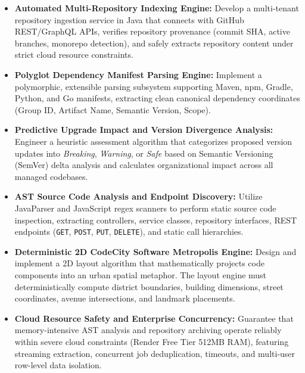 \documentclass[11pt,a4paper,openany]{report}
\begin{document}
\begin{itemize}[leftmargin=1.5cm]
    \item[\textbf{OBJ-1:}] \textbf{Automated Multi-Repository Indexing Engine:} Develop a multi-tenant repository ingestion service in Java that connects with GitHub REST/GraphQL APIs, verifies repository provenance (commit SHA, active branches, monorepo detection), and safely extracts repository content under strict cloud resource constraints.
    
    \item[\textbf{OBJ-2:}] \textbf{Polyglot Dependency Manifest Parsing Engine:} Implement a polymorphic, extensible parsing subsystem supporting Maven, npm, Gradle, Python, and Go manifests, extracting clean canonical dependency coordinates (Group ID, Artifact Name, Semantic Version, Scope).
    
    \item[\textbf{OBJ-3:}] \textbf{Predictive Upgrade Impact and Version Divergence Analysis:} Engineer a heuristic assessment algorithm that categorizes proposed version updates into \textit{Breaking}, \textit{Warning}, or \textit{Safe} based on Semantic Versioning (SemVer) delta analysis and calculates organizational impact across all managed codebases.
    
    \item[\textbf{OBJ-4:}] \textbf{AST Source Code Analysis and Endpoint Discovery:} Utilize JavaParser and JavaScript regex scanners to perform static source code inspection, extracting controllers, service classes, repository interfaces, REST endpoints (\texttt{GET}, \texttt{POST}, \texttt{PUT}, \texttt{DELETE}), and static call hierarchies.
    
    \item[\textbf{OBJ-5:}] \textbf{Deterministic 2D CodeCity Software Metropolis Engine:} Design and implement a 2D layout algorithm that mathematically projects code components into an urban spatial metaphor. The layout engine must deterministically compute district boundaries, building dimensions, street coordinates, avenue intersections, and landmark placements.
    
    \item[\textbf{OBJ-6:}] \textbf{Cloud Resource Safety and Enterprise Concurrency:} Guarantee that memory-intensive AST analysis and repository archiving operate reliably within severe cloud constraints (Render Free Tier 512MB RAM), featuring streaming extraction, concurrent job deduplication, timeouts, and multi-user row-level data isolation.
\end{itemize}
\end{document}
